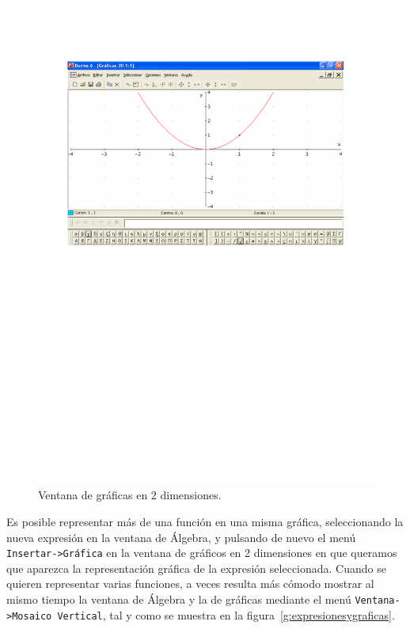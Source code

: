 \begin{figure}[h!]
\begin{center}
\includegraphics[scale=0.9]{img/introduccion_derive/2d-plot}
\caption{Ventana de gráficas en 2 dimensiones.} \label{g:2d-plot}
\end{center}
\end{figure}

Es posible representar más de una función en una misma gráfica,
seleccionando la nueva expresión en la ventana de Álgebra, y
pulsando de nuevo el menú \texttt{Insertar->Gráfica} en la ventana
de gráficos en 2 dimensiones en que queramos que aparezca la
representación gráfica de la expresión seleccionada. Cuando se
quieren representar varias funciones, a veces resulta más cómodo
mostrar al mismo tiempo la ventana de Álgebra y la de gráficas
mediante el menú \texttt{Ventana->Mosaico Vertical}, tal y como se
muestra en la figura~\ref{g:expresionesygraficas}.

